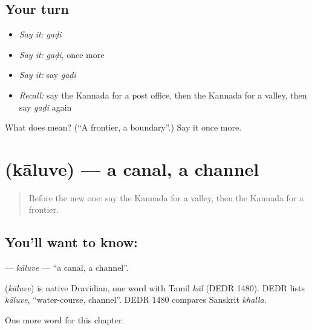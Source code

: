 \subsection*{Your turn}
\begin{itemize}
\raggedright
  \item \emph{Say it:} \emph{gaḍi}
  \item \emph{Say it:} \emph{gaḍi}, once more
  \item \emph{Say it:} say \emph{gaḍi}
  \item \emph{Recall:} say the Kannada for a post office, then the Kannada for a valley, then say \emph{gaḍi} again
\end{itemize}

\begin{tcolorbox}[breakable,colback=teal!4,colframe=teal!35!black,title={Before you move on}]
What does  mean? (\textquotedblleft{}A frontier, a boundary\textquotedblright{}.) Say it once more.
\end{tcolorbox}
\section[\texorpdfstring{\kn{ಕಾಲುವೆ} (kāluve)}{ಕಾಲುವೆ (kāluve)}]{ (kāluve) — a canal, a channel}

\label{lesson:KA-C251-kaluve}



\begin{quote}
Before the new one: say the Kannada for a valley, then the Kannada for a frontier.
\end{quote}

\subsection*{You'll want to know: }
\textbf{} — \emph{kāluve} — \textquotedblleft{}a canal, a channel\textquotedblright{}.

\begin{cousinweb}
\textbf{} (\emph{kāluve}) is native Dravidian, one word with Tamil \emph{kāl} (DEDR 1480). DEDR lists \emph{kāluve}, \textquotedblleft{}water-course, channel\textquotedblright{}. DEDR 1480 compares Sanskrit \emph{khalla}.
\end{cousinweb}

\begin{grammarlens}[title={What you've built}]
One more word for this chapter.
\end{grammarlens}


